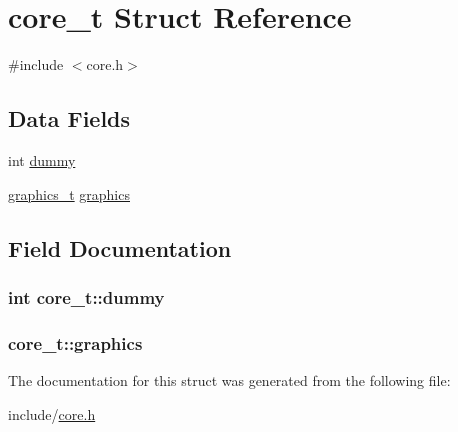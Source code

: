 \hypertarget{structcore__t}{}\section{core\+\_\+t Struct Reference}
\label{structcore__t}


{\ttfamily \#include $<$core.\+h$>$}

\subsection*{Data Fields}
\begin{DoxyCompactItemize}
\item 
int \hyperlink{structcore__t_aa8a3cd0e77fc7a69f992186415f6e6a1}{dummy}
\item 
\hyperlink{structgraphics__t}{graphics\+\_\+t} \hyperlink{structcore__t_a4728ed027923dd8568023862dd2887ef}{graphics}
\end{DoxyCompactItemize}


\subsection{Field Documentation}
\subsubsection[{\texorpdfstring{dummy}{dummy}}]{\setlength{\rightskip}{0pt plus 5cm}int core\+\_\+t\+::dummy}\hypertarget{structcore__t_aa8a3cd0e77fc7a69f992186415f6e6a1}{}\label{structcore__t_aa8a3cd0e77fc7a69f992186415f6e6a1}
\subsubsection[{\texorpdfstring{graphics}{graphics}}]{ core\+\_\+t\+::graphics}\hypertarget{structcore__t_a4728ed027923dd8568023862dd2887ef}{}\label{structcore__t_a4728ed027923dd8568023862dd2887ef}


The documentation for this struct was generated from the following file\+:\begin{DoxyCompactItemize}
\item 
include/\hyperlink{core_8h}{core.\+h}\end{DoxyCompactItemize}
